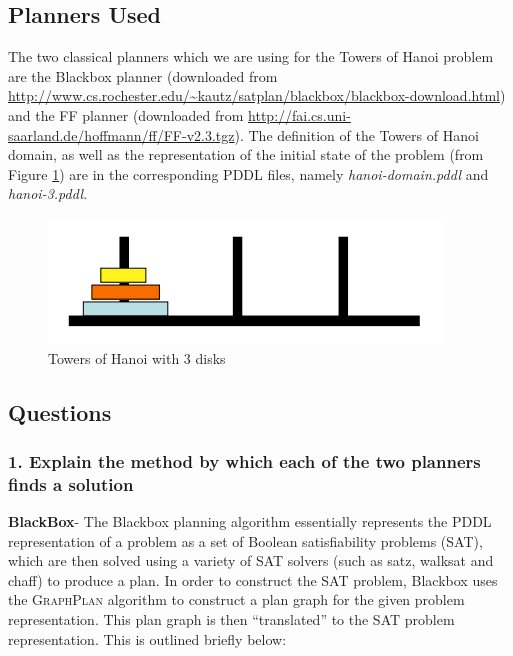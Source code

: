 \documentclass[10pt, letter]{article}
\begin{document}
\subsection*{Planners Used}
The two classical planners which we are using for the Towers of Hanoi problem are the Blackbox planner \cite{kautz1998blackbox} (downloaded from \url{http://www.cs.rochester.edu/~kautz/satplan/blackbox/blackbox-download.html}) and the FF planner \cite{hoffmann2001fast} (downloaded from \url{http://fai.cs.uni-saarland.de/hoffmann/ff/FF-v2.3.tgz}). The definition of the Towers of Hanoi domain, as well as the representation of the initial state of the problem (from Figure \ref{fig1}) are in the corresponding PDDL files, namely \textit{hanoi-domain.pddl} and \textit{hanoi-3.pddl}.

\begin{figure}[h!]
  \centering
    \includegraphics[scale = 0.3]{images/hanoi1}
    \caption{Towers of Hanoi with 3 disks}
  \label{fig1}
\end{figure}

\subsection{Questions}
\subsubsection*{1. Explain the method by which each of the two planners finds a solution}
\textbf{BlackBox}- The Blackbox planning algorithm essentially represents the PDDL representation of a problem as a set of Boolean satisfiability problems (SAT), which are then solved using a variety of SAT solvers (such as satz, walksat and chaff) to produce a plan.
In order to construct the SAT problem, Blackbox uses the \textsc{GraphPlan} algorithm to construct a plan graph for the given problem representation. This plan graph is then ``translated'' to the SAT problem representation. This is outlined briefly below:
\end{document}
